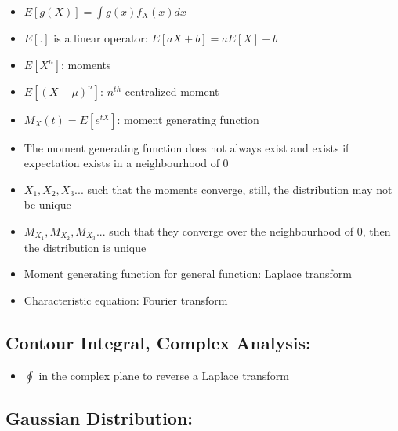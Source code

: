 \documentclass[11pt,letterpaper,titlepage]{article}
\begin{document}
\begin{itemize}

    \item $E[g(X)] = \int g(x) f_X(x) dx$
    
    \item $E[.]$ is a linear operator: $E[aX + b] = aE[X] + b$
    
    \item $E[X^n]$: moments
    
    \item $E[(X - \mu)^n]$: $n^{th}$ centralized moment
    
    \item $M_X(t) = E[e^{tX}]$: moment generating function
    
    \item The moment generating function does not always exist and exists if expectation exists in a neighbourhood of 0
    
    \item $X_1, X_2, X_3...$ such that the moments converge, still, the distribution may not be unique
    
    \item $M_{X_1}, M_{X_2}, M_{X_3}...$ such that they converge over the neighbourhood of 0, then the distribution is unique
    
    \item Moment generating function for general function: Laplace transform
    
    \item Characteristic equation: Fourier transform
    
\end{itemize}

\subsection{Contour Integral, Complex Analysis:}

\begin{itemize}

    \item $\oint$ in the complex plane to reverse a Laplace transform
    
\end{itemize}

\subsection{Gaussian Distribution:}
\end{document}
